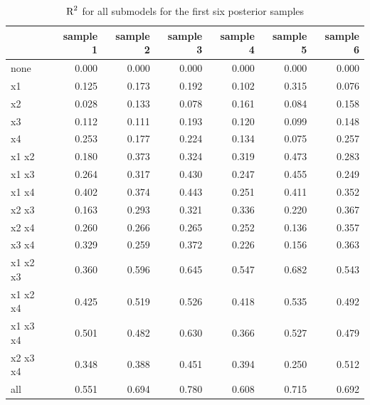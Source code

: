 \documentclass[11pt,a4paper,twoside]{book}\usepackage[]{graphicx}\usepackage[]{color}
\newenvironment{knitrout}{}{} %
\begin{document}
\begin{knitrout}
\color{fgcolor}\begin{table}

\caption{\label{tab:simdata.postsample3}$ \text{R}^2$ for all submodels for the first six posterior samples}
\centering
\begin{tabular}[t]{lrrrrrr}
\toprule
  & sample 1 & sample 2 & sample 3 & sample 4 & sample 5 & sample 6\\
\midrule
none & 0.000 & 0.000 & 0.000 & 0.000 & 0.000 & 0.000\\
x1 & 0.125 & 0.173 & 0.192 & 0.102 & 0.315 & 0.076\\
x2 & 0.028 & 0.133 & 0.078 & 0.161 & 0.084 & 0.158\\
x3 & 0.112 & 0.111 & 0.193 & 0.120 & 0.099 & 0.148\\
x4 & 0.253 & 0.177 & 0.224 & 0.134 & 0.075 & 0.257\\
x1 x2 & 0.180 & 0.373 & 0.324 & 0.319 & 0.473 & 0.283\\
x1 x3 & 0.264 & 0.317 & 0.430 & 0.247 & 0.455 & 0.249\\
x1 x4 & 0.402 & 0.374 & 0.443 & 0.251 & 0.411 & 0.352\\
x2 x3 & 0.163 & 0.293 & 0.321 & 0.336 & 0.220 & 0.367\\
x2 x4 & 0.260 & 0.266 & 0.265 & 0.252 & 0.136 & 0.357\\
x3 x4 & 0.329 & 0.259 & 0.372 & 0.226 & 0.156 & 0.363\\
x1 x2 x3 & 0.360 & 0.596 & 0.645 & 0.547 & 0.682 & 0.543\\
x1 x2 x4 & 0.425 & 0.519 & 0.526 & 0.418 & 0.535 & 0.492\\
x1 x3 x4 & 0.501 & 0.482 & 0.630 & 0.366 & 0.527 & 0.479\\
x2 x3 x4 & 0.348 & 0.388 & 0.451 & 0.394 & 0.250 & 0.512\\
all & 0.551 & 0.694 & 0.780 & 0.608 & 0.715 & 0.692\\
\bottomrule
\end{tabular}
\end{table}


\end{knitrout}
\end{document}
